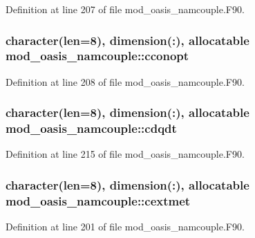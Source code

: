 Definition at line 207 of file mod\+\_\+oasis\+\_\+namcouple.\+F90.

\hypertarget{classmod__oasis__namcouple_a240979dfe7369da899b0cfe2aeba4f9d}{
\subsubsection[{cconopt}]{\setlength{\rightskip}{0pt plus 5cm}character(len=8), dimension(\+:), allocatable mod\+\_\+oasis\+\_\+namcouple\+::cconopt\hspace{0.3cm}{\ttfamily [private]}}}\label{classmod__oasis__namcouple_a240979dfe7369da899b0cfe2aeba4f9d}


Definition at line 208 of file mod\+\_\+oasis\+\_\+namcouple.\+F90.

\hypertarget{classmod__oasis__namcouple_a9c5a3b3a864f3feb95eddc08616b998e}{
\subsubsection[{cdqdt}]{\setlength{\rightskip}{0pt plus 5cm}character(len=8), dimension(\+:), allocatable mod\+\_\+oasis\+\_\+namcouple\+::cdqdt\hspace{0.3cm}{\ttfamily [private]}}}\label{classmod__oasis__namcouple_a9c5a3b3a864f3feb95eddc08616b998e}


Definition at line 215 of file mod\+\_\+oasis\+\_\+namcouple.\+F90.

\hypertarget{classmod__oasis__namcouple_a1066d92e6c9301bdb46ddda7edd7d29a}{
\subsubsection[{cextmet}]{\setlength{\rightskip}{0pt plus 5cm}character(len=8), dimension(\+:), allocatable mod\+\_\+oasis\+\_\+namcouple\+::cextmet\hspace{0.3cm}{\ttfamily [private]}}}\label{classmod__oasis__namcouple_a1066d92e6c9301bdb46ddda7edd7d29a}


Definition at line 201 of file mod\+\_\+oasis\+\_\+namcouple.\+F90.

